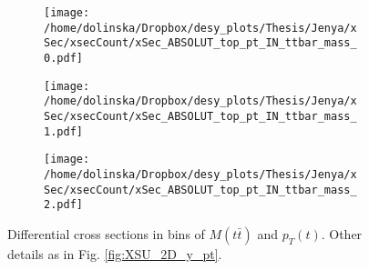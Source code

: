 \begin{figure}[p]
\centering
\begin{subfigure}
  \centering
  \texttt{[image: /home/dolinska/Dropbox/desy\_plots/Thesis/Jenya/xSec/xsecCount/xSec\_ABSOLUT\_top\_pt\_IN\_ttbar\_mass\_0.pdf]}
\end{subfigure}
\begin{subfigure}
  \centering
  \texttt{[image: /home/dolinska/Dropbox/desy\_plots/Thesis/Jenya/xSec/xsecCount/xSec\_ABSOLUT\_top\_pt\_IN\_ttbar\_mass\_1.pdf]}
\end{subfigure}
\begin{subfigure}
  \centering
  \texttt{[image: /home/dolinska/Dropbox/desy\_plots/Thesis/Jenya/xSec/xsecCount/xSec\_ABSOLUT\_top\_pt\_IN\_ttbar\_mass\_2.pdf]}
\end{subfigure}
\caption{Differential cross sections in bins of $M(t\bar{t})$ and $p_{T}(t)$. Other details as in Fig. \ref{fig:XSU_2D_y_pt}.}
\label{fig:XSU_2D_Mtt_pt}
\end{figure}

